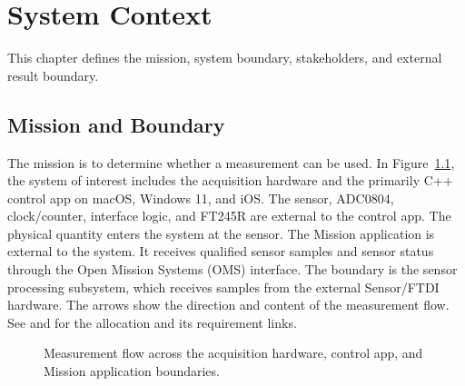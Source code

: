 \chapter{System Context}
\label{Section:SystemContextResponsibility}
This chapter defines the mission, system boundary, stakeholders, and external result boundary.
%


\section{Mission and Boundary}
\label{Section:MeasurementMission}
The mission is to determine whether a measurement can be used. In
Figure~\ref{Figure:SensorContext}, the system of interest includes the
acquisition hardware and the primarily C++ control app on macOS, Windows 11, and iOS. The sensor, ADC0804,
clock/counter, interface logic, and FT245R are external to the control app.
The physical quantity enters the system at the sensor. The Mission application is external to the system. It receives qualified
sensor samples and sensor status through the Open Mission Systems (OMS)
interface. The  boundary is the sensor processing
subsystem, which receives samples from the external Sensor/FTDI hardware.
The arrows show the direction and content of the measurement flow. See
 and  for the allocation
and its requirement links.
\begin{figure}[!htbp]
\centering

\caption{Measurement flow across the acquisition hardware, control app, and Mission application boundaries.}
\label{Figure:SensorContext}
\end{figure}

